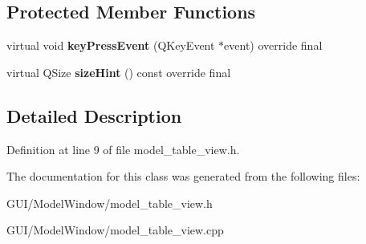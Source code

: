 \subsection*{Protected Member Functions}
\begin{DoxyCompactItemize}
\item 
\mbox{\label{classModelTableView_a8624c6f242a68c23550dcd5e95277781}} 
virtual void {\bfseries key\+Press\+Event} (Q\+Key\+Event $\ast$event) override final
\item 
\mbox{\label{classModelTableView_a234ac535e1561096114f2c4a05331282}} 
virtual Q\+Size {\bfseries size\+Hint} () const override final
\end{DoxyCompactItemize}


\subsection{Detailed Description}


Definition at line 9 of file model\+\_\+table\+\_\+view.\+h.



The documentation for this class was generated from the following files\+:\begin{DoxyCompactItemize}
\item 
G\+U\+I/\+Model\+Window/model\+\_\+table\+\_\+view.\+h\item 
G\+U\+I/\+Model\+Window/model\+\_\+table\+\_\+view.\+cpp\end{DoxyCompactItemize}
